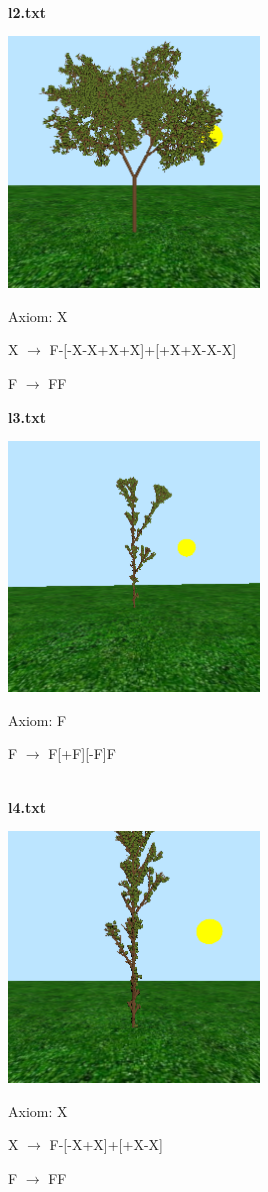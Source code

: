 \documentclass[11pt]{article} %
\begin{document}
{
\centering

\textbf{\\l2.txt} 

\includegraphics[width=0.5\textwidth]{003}

Axiom: X

X $\rightarrow$ F-[-X-X+X+X]+[+X+X-X-X]

F $\rightarrow$ FF

}
\newpage{}
{
\centering

\textbf{l3.txt} 

\includegraphics[width=0.5\textwidth]{006}

Axiom: F

F $\rightarrow$ F[+F][-F]F


}
{
\centering

\textbf{\\l4.txt} 

\includegraphics[width=0.5\textwidth]{004}

Axiom: X

X $\rightarrow$ F-[-X+X]+[+X-X]

F $\rightarrow$ FF


}
\end{document}
